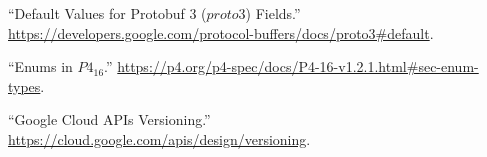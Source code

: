 \documentclass[11pt]{article}
\begin{document}
{{\begin{thebibliography}{39}
\mdbibitemlabel{{}[4]}\textquotedblleft{}Default Values for Protobuf 3 ($proto3$) Fields.\textquotedblright{} \href{https://developers.google.com/protocol-buffers/docs/proto3\%23default}{{\ttfamily https://\hspace{0pt}developers.\hspace{0pt}google.\hspace{0pt}com/\hspace{0pt}protocol-\hspace{0pt}buffers/\hspace{0pt}docs/\hspace{0pt}proto3\#\hspace{0pt}default}}.\label{protodefaults}%

\mdbibitemlabel{{}[5]}\textquotedblleft{}Enums in $P4_{16}$.\textquotedblright{} \href{https://p4.org/p4-spec/docs/P4-16-v1.2.1.html\%23sec-enum-types}{{\ttfamily https://\hspace{0pt}p4.\hspace{0pt}org/\hspace{0pt}p4-\hspace{0pt}spec/\hspace{0pt}docs/\hspace{0pt}P4-\hspace{0pt}16-\hspace{0pt}v1.\hspace{0pt}2.\hspace{0pt}1.\hspace{0pt}html\#\hspace{0pt}sec-\hspace{0pt}enum-\hspace{0pt}types}}.\label{p4enums}%

\mdbibitemlabel{{}[6]}\textquotedblleft{}Google Cloud APIs Versioning.\textquotedblright{} \href{https://cloud.google.com/apis/design/versioning}{{\ttfamily https://\hspace{0pt}cloud.\hspace{0pt}google.\hspace{0pt}com/\hspace{0pt}apis/\hspace{0pt}design/\hspace{0pt}versioning}}.\label{apiversioning}%


\end{thebibliography}}}
\end{document}
